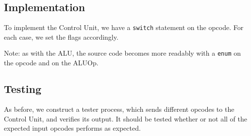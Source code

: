 \documentclass{beamer}
\begin{document}
\subsection{Implementation}
\begin{frame}
    To implement the Control Unit, we have a \texttt{switch} statement on the
    opcode. For each case, we set the flags accordingly.

    \vspace{\baselineskip}
    Note: as with the ALU, the source code becomes more readably with a
    \texttt{enum} on the opcode and on the ALUOp.
\end{frame}
\subsection{Testing}
\begin{frame}
    As before, we construct a tester process, which sends different opcodes to
    the Control Unit, and verifies its output. It should be tested whether or
    not all of the expected input opcodes performs as expected.
\end{frame}
\end{document}
